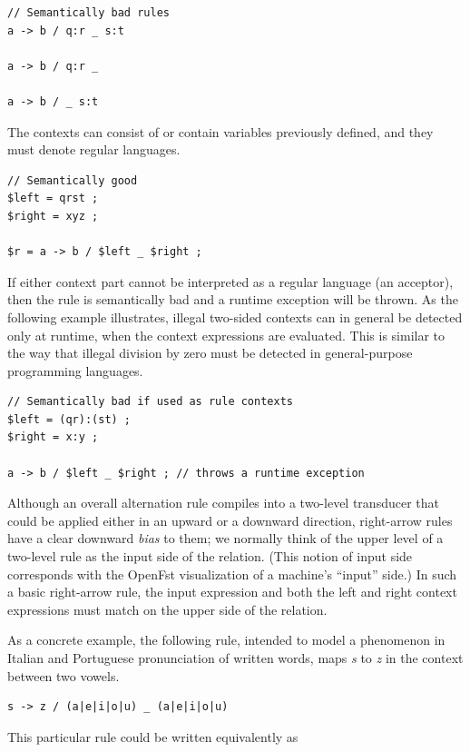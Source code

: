 \begin{Verbatim}
// Semantically bad rules
a -> b / q:r _ s:t

a -> b / q:r _

a -> b / _ s:t
\end{Verbatim}

\noindent
The contexts can consist of or contain variables previously defined, and they must denote regular languages.


\begin{Verbatim}
// Semantically good
$left = qrst ;
$right = xyz ;

$r = a -> b / $left _ $right ;
\end{Verbatim}

\noindent
If either context part cannot be interpreted as a regular language (an acceptor), then the rule is semantically bad and
a runtime exception will be thrown.  As the following example illustrates, illegal two-sided contexts can in general be detected
only at runtime, when the context expressions are evaluated.  This is similar to the way that illegal division by zero
must be detected in general-purpose programming languages.

\begin{Verbatim}
// Semantically bad if used as rule contexts
$left = (qr):(st) ;
$right = x:y ;

a -> b / $left _ $right ; // throws a runtime exception
\end{Verbatim}


Although an overall alternation rule compiles into a two-level transducer that could be applied either in an
upward or a downward direction, right-arrow rules have a clear downward \emph{bias} to them;
we normally think of the upper level of a two-level rule as the input side of the
relation.  (This notion of input side corresponds with the OpenFst visualization of a
machine's ``input'' side.)
In such a basic right-arrow rule, the input expression and both the left
and right context expressions must match on the upper side of the relation.

As a concrete example, the following rule, intended to model a phenomenon in Italian and Portuguese
pronunciation of written words, maps \emph{s} to \emph{z} in the context between two vowels.


\begin{Verbatim}
s -> z / (a|e|i|o|u) _ (a|e|i|o|u)
\end{Verbatim}

\noindent
This particular rule could be written equivalently as


